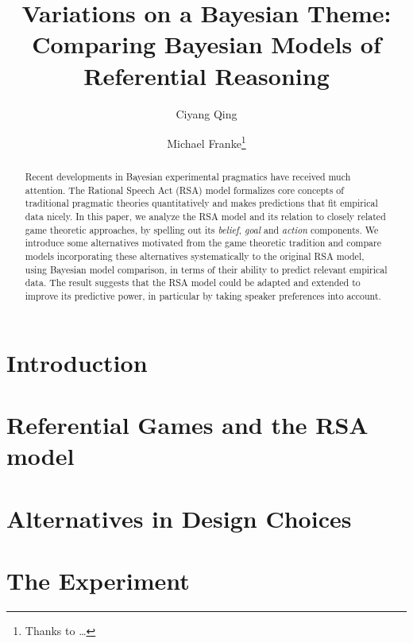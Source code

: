 \documentclass{llncs}
\title{Variations on a Bayesian Theme: Comparing Bayesian Models of
  Referential Reasoning}
\author{Ciyang Qing \and Michael Franke\thanks{Thanks to \dots %
}}
\institute{Institute for Logic, Language and Computation\\Universtity
  of Amsterdam, The Netherlands}
\begin{document}
\maketitle

\begin{abstract}
  Recent developments in Bayesian experimental pragmatics have
  received much attention. The Rational Speech Act (RSA) model
  formalizes core concepts of traditional pragmatic theories
  quantitatively and makes predictions that fit empirical data
  nicely. In this paper, we analyze the RSA model and its relation to
  closely related game theoretic approaches, by spelling out its
  \emph{belief}, \emph{goal} and \emph{action} components. We
  introduce some alternatives motivated from the game theoretic
  tradition and compare models incorporating these alternatives
  systematically to the original RSA model, using Bayesian model
  comparison, in terms of their ability to predict relevant empirical
  data. The result suggests that the RSA model could be adapted and
  extended to improve its predictive power, in particular by taking
  speaker preferences into account. 
\end{abstract}

\section{Introduction}




\section{Referential Games and the RSA model}
\label{sec:refer-games-rsa}




\section{Alternatives in Design Choices}
\label{sec:alternatives}




\section{The Experiment}
\label{sec:experiment}
\end{document}

